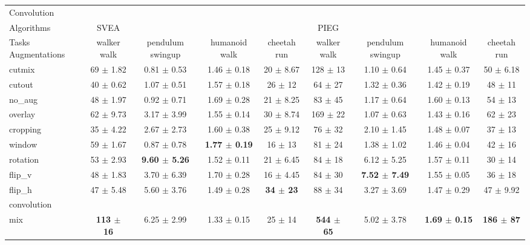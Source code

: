 \begin{tabular}{lcccccccc}
Convolution & & & & & & & & \\
Algorithms & SVEA & & & & PIEG & & & \\
Tasks Augmentations & walker walk & pendulum swingup & humanoid walk & cheetah run & walker walk & pendulum swingup & humanoid walk & cheetah run \\
cutmix          & 69 $\pm$ 1.82 & 0.81 $\pm$ 0.53 & 1.46 $\pm$ 0.18 & 20 $\pm$ 8.67 & 128 $\pm$ 13 & 1.10 $\pm$ 0.64 & 1.45 $\pm$ 0.37 & 50 $\pm$ 6.18 \\
cutout          & 40 $\pm$ 0.62 & 1.07 $\pm$ 0.51 & 1.57 $\pm$ 0.18 & 26 $\pm$ 12 & 64 $\pm$ 27 & 1.32 $\pm$ 0.36 & 1.42 $\pm$ 0.19 & 48 $\pm$ 11 \\
no\_aug         & 48 $\pm$ 1.97 & 0.92 $\pm$ 0.71 & 1.69 $\pm$ 0.28 & 21 $\pm$ 8.25 & 83 $\pm$ 45 & 1.17 $\pm$ 0.64 & 1.60 $\pm$ 0.13 & 54 $\pm$ 13 \\
overlay         & 62 $\pm$ 9.73 & 3.17 $\pm$ 3.99 & 1.55 $\pm$ 0.14 & 30 $\pm$ 8.74 & 169 $\pm$ 22 & 1.07 $\pm$ 0.63 & 1.43 $\pm$ 0.16 & 62 $\pm$ 23 \\
cropping        & 35 $\pm$ 4.22 & 2.67 $\pm$ 2.73 & 1.60 $\pm$ 0.38 & 25 $\pm$ 9.12 & 76 $\pm$ 32 & 2.10 $\pm$ 1.45 & 1.48 $\pm$ 0.07 & 37 $\pm$ 13 \\
window          & 59 $\pm$ 1.67 & 0.87 $\pm$ 0.78 & \textbf{1.77 $\pm$ 0.19} & 16 $\pm$ 13 & 81 $\pm$ 24 & 1.38 $\pm$ 1.02 & 1.46 $\pm$ 0.04 & 42 $\pm$ 16 \\
rotation        & 53 $\pm$ 2.93 & \textbf{9.60 $\pm$ 5.26} & 1.52 $\pm$ 0.11 & 21 $\pm$ 6.45 & 84 $\pm$ 18 & 6.12 $\pm$ 5.25 & 1.57 $\pm$ 0.11 & 30 $\pm$ 14 \\
flip\_v         & 48 $\pm$ 1.83 & 3.70 $\pm$ 6.39 & 1.70 $\pm$ 0.28 & 16 $\pm$ 4.45 & 84 $\pm$ 30 & \textbf{7.52 $\pm$ 7.49} & 1.55 $\pm$ 0.05 & 36 $\pm$ 18 \\
flip\_h         & 47 $\pm$ 5.48 & 5.60 $\pm$ 3.76 & 1.49 $\pm$ 0.28 & \textbf{34 $\pm$ 23} & 88 $\pm$ 34 & 3.27 $\pm$ 3.69 & 1.47 $\pm$ 0.29 & 47 $\pm$ 9.92 \\
convolution     &  &  &  &  &  &  &  &  \\
mix             & \textbf{113 $\pm$ 16} & 6.25 $\pm$ 2.99 & 1.33 $\pm$ 0.15 & 25 $\pm$ 14 & \textbf{544 $\pm$ 65} & 5.02 $\pm$ 3.78 & \textbf{1.69 $\pm$ 0.15} & \textbf{186 $\pm$ 87} \\
\end{tabular}